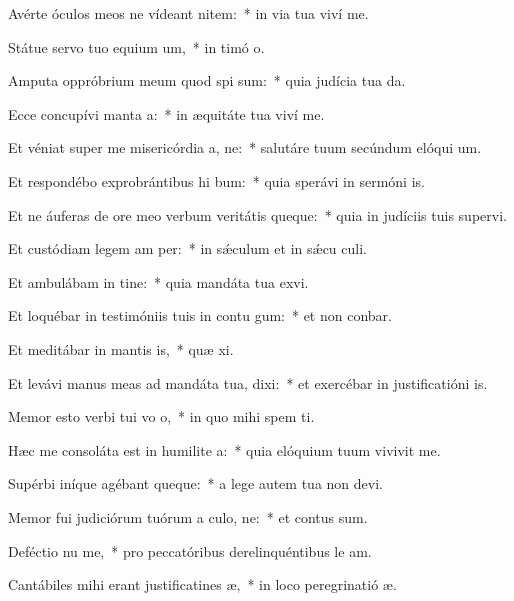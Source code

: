 \item Avérte óculos meos ne vídeant nitem:~* in via tua viví me.
\item Státue servo tuo equium um,~* in timó o.
\item Amputa oppróbrium meum quod spi sum:~* quia judícia tua da.
\item Ecce concupívi manta a:~* in æquitáte tua viví me.
\item Et véniat super me misericórdia a, ne:~* salutáre tuum secúndum elóqui um.
\item Et respondébo exprobrántibus hi bum:~* quia sperávi in sermóni is.
\item Et ne áuferas de ore meo verbum veritátis queque:~* quia in judíciis tuis supervi.
\item Et custódiam legem am per:~* in sǽculum et in sǽcu culi.
\item Et ambulábam in tine:~* quia mandáta tua exvi.
\item Et loquébar in testimóniis tuis in contu gum:~* et non conbar.
\item Et meditábar in mantis is,~* quæ xi.
\item Et levávi manus meas ad mandáta tua,  dixi:~* et exercébar in justificatióni is.
\item Memor esto verbi tui vo o,~* in quo mihi spem ti.
\item Hæc me consoláta est in humilite a:~* quia elóquium tuum vivivit me.
\item Supérbi iníque agébant queque:~* a lege autem tua non devi.
\item Memor fui judiciórum tuórum a culo, ne:~* et contus sum.
\item Deféctio nu me,~* pro peccatóribus derelinquéntibus le am.
\item Cantábiles mihi erant justificatines æ,~* in loco peregrinatió æ.
